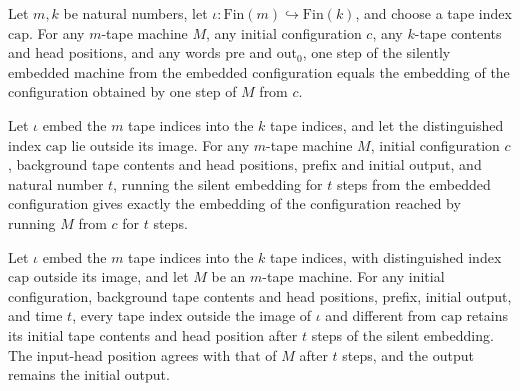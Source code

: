 \begin{lemma}
\label{Turing.embedSilent_step}
\leanok
{}
Let $m,k$ be natural numbers, let $\iota:\mathrm{Fin}(m)\hookrightarrow\mathrm{Fin}(k)$,
and choose a tape index $\mathrm{cap}$. For any $m$-tape machine $M$, any initial
configuration $c$, any $k$-tape contents and head positions, and any words
$\mathrm{pre}$ and $\mathrm{out}_0$, one step of the silently embedded machine from the
embedded configuration equals the embedding of the configuration obtained by one step of
$M$ from $c$.
\end{lemma}

\begin{theorem}
\label{Turing.embedSilentTM_runFrom}
\leanok
{}
Let $\iota$ embed the $m$ tape indices into the $k$ tape indices, and let the
distinguished index $\mathrm{cap}$ lie outside its image. For any $m$-tape machine $M$,
initial configuration $c$, background tape contents and head positions, prefix and
initial output, and natural number $t$, running the silent embedding for $t$ steps from
the embedded configuration gives exactly the embedding of the configuration reached by
running $M$ from $c$ for $t$ steps.
\end{theorem}

\begin{theorem}
\label{Turing.embedSilentTM_frame}
\leanok
{}
Let $\iota$ embed the $m$ tape indices into the $k$ tape indices, with distinguished
index $\mathrm{cap}$ outside its image, and let $M$ be an $m$-tape machine. For any
initial configuration, background tape contents and head positions, prefix, initial
output, and time $t$, every tape index outside the image of $\iota$ and different from
$\mathrm{cap}$ retains its initial tape contents and head position after $t$ steps of
the silent embedding. The input-head position agrees with that of $M$ after $t$ steps,
and the output remains the initial output.
\end{theorem}

